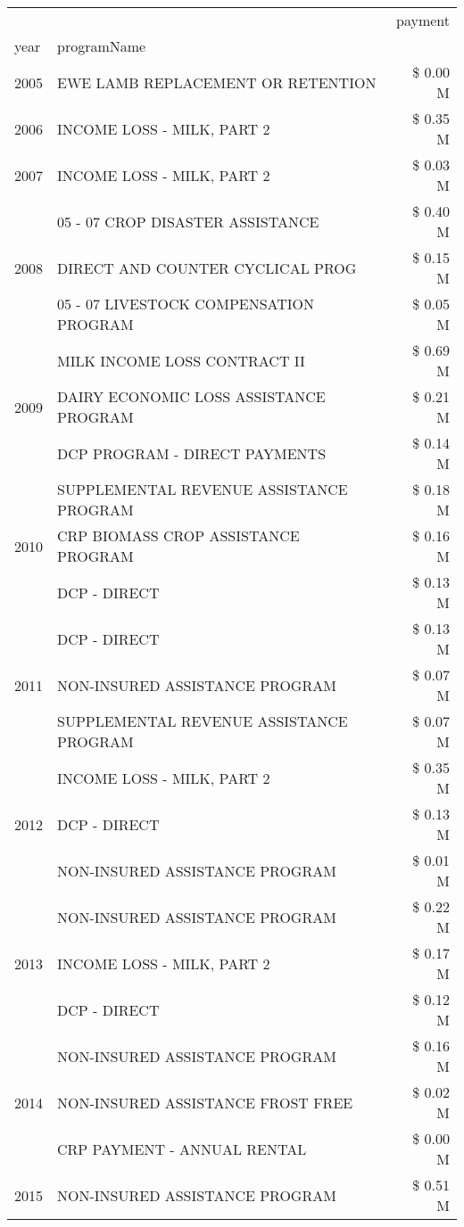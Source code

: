 \begin{tabular}{llr}
\toprule
 &  & payment \\
year & programName &  \\
\midrule
2005 & EWE LAMB REPLACEMENT OR RETENTION & \$ 0.00 M \\
\cline{1-3}
2006 & INCOME LOSS - MILK, PART 2 & \$ 0.35 M \\
\cline{1-3}
2007 & INCOME LOSS - MILK, PART 2 & \$ 0.03 M \\
\cline{1-3}
\multirow[t]{3}{*}{2008} & 05 - 07 CROP DISASTER ASSISTANCE & \$ 0.40 M \\
 & DIRECT AND COUNTER CYCLICAL PROG & \$ 0.15 M \\
 & 05 - 07 LIVESTOCK COMPENSATION PROGRAM & \$ 0.05 M \\
\cline{1-3}
\multirow[t]{3}{*}{2009} & MILK INCOME LOSS CONTRACT II & \$ 0.69 M \\
 & DAIRY ECONOMIC LOSS ASSISTANCE PROGRAM & \$ 0.21 M \\
 & DCP PROGRAM - DIRECT PAYMENTS & \$ 0.14 M \\
\cline{1-3}
\multirow[t]{3}{*}{2010} & SUPPLEMENTAL REVENUE ASSISTANCE PROGRAM & \$ 0.18 M \\
 & CRP BIOMASS CROP ASSISTANCE PROGRAM & \$ 0.16 M \\
 & DCP - DIRECT & \$ 0.13 M \\
\cline{1-3}
\multirow[t]{3}{*}{2011} & DCP - DIRECT & \$ 0.13 M \\
 & NON-INSURED ASSISTANCE PROGRAM & \$ 0.07 M \\
 & SUPPLEMENTAL REVENUE ASSISTANCE PROGRAM & \$ 0.07 M \\
\cline{1-3}
\multirow[t]{3}{*}{2012} & INCOME LOSS - MILK, PART 2 & \$ 0.35 M \\
 & DCP - DIRECT & \$ 0.13 M \\
 & NON-INSURED ASSISTANCE PROGRAM & \$ 0.01 M \\
\cline{1-3}
\multirow[t]{3}{*}{2013} & NON-INSURED ASSISTANCE PROGRAM & \$ 0.22 M \\
 & INCOME LOSS - MILK, PART 2 & \$ 0.17 M \\
 & DCP - DIRECT & \$ 0.12 M \\
\cline{1-3}
\multirow[t]{3}{*}{2014} & NON-INSURED ASSISTANCE PROGRAM & \$ 0.16 M \\
 & NON-INSURED ASSISTANCE FROST FREE & \$ 0.02 M \\
 & CRP PAYMENT - ANNUAL RENTAL & \$ 0.00 M \\
\cline{1-3}
\multirow[t]{3}{*}{2015} & NON-INSURED ASSISTANCE PROGRAM & \$ 0.51 M \\

\end{tabular}
